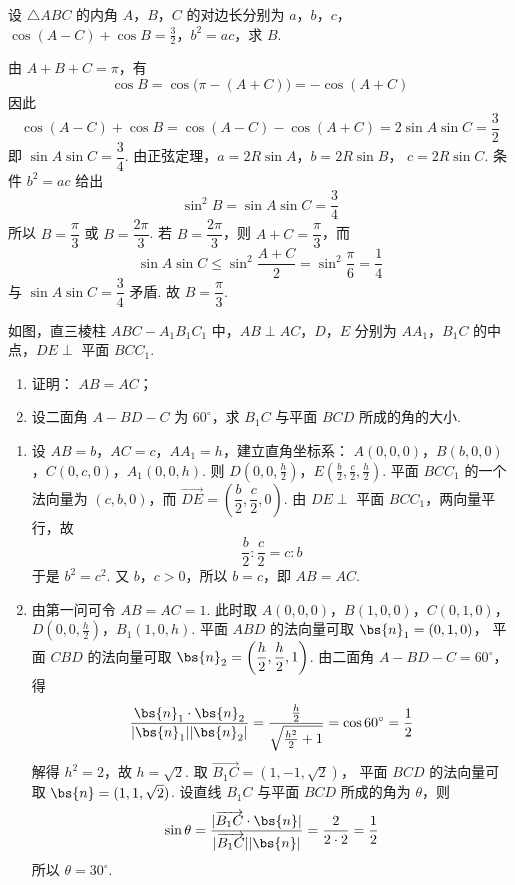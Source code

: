 \begin{problem}
设 \(\triangle ABC\) 的内角 \(A\)，\(B\)，\(C\) 的对边长分别为 \(a\)，\(b\)，\(c\)，\(\cos (A - C) + \cos B = \frac{3}{2}\)，\(b^2 = ac\)，求 \(B\).
\end{problem}

\begin{solution}
由 \(A+B+C=\pi\)，有
\[
\cos B=\cos\bigl(\pi-(A+C)\bigr)=-\cos(A+C)
\]
因此
\[
\cos(A-C)+\cos B
=\cos(A-C)-\cos(A+C)
=2\sin A\sin C=\frac32
\]
即 \(\sin A\sin C=\dfrac34\).
由正弦定理，\(a=2R\sin A\)，\(b=2R\sin B\)，
\(c=2R\sin C\). 条件 \(b^2=ac\) 给出
\[
\sin^2B=\sin A\sin C=\frac34
\]
所以 \(B=\dfrac{\pi}{3}\) 或 \(B=\dfrac{2\pi}{3}\).
若 \(B=\dfrac{2\pi}{3}\)，则 \(A+C=\dfrac{\pi}{3}\)，而
\[
\sin A\sin C\leqslant
\sin^2\frac{A+C}{2}=\sin^2\frac{\pi}{6}=\frac14
\]
与 \(\sin A\sin C=\dfrac34\) 矛盾. 故
\(B=\dfrac{\pi}{3}\).
\end{solution}

\begin{problem}
如图，直三棱柱 \(ABC - A_{1}B_{1}C_{1}\) 中，\(AB \perp AC\)，\(D\)，\(E\) 分别为 \(A A_{1}\)，\(B_{1}C\) 的中点，\(DE \perp\) 平面 \(BCC_{1}\).

\begin{enumerate}
\item 证明： \(AB = AC\)；
\item 设二面角 \(A - BD - C\) 为 \(60^{\circ}\)，求 \(B_{1}C\) 与平面 \(BCD\) 所成的角的大小.
\end{enumerate}

\end{problem}

\begin{solution}
\begin{enumerate}
\item 设 \(AB=b\)，\(AC=c\)，\(AA_1=h\)，建立直角坐标系：
\(A(0,0,0)\)，\(B(b,0,0)\)，\(C(0,c,0)\)，\(A_1(0,0,h)\).
则
\(D\left(0,0,\frac h2\right)\)，\(E\left(\frac b2,\frac c2,\frac h2\right)\).
平面 \(BCC_1\) 的一个法向量为 \((c,b,0)\)，而
\(\overrightarrow{DE}=\left(\dfrac b2,\dfrac c2,0\right)\).
由 \(DE\perp\) 平面 \(BCC_1\)，两向量平行，故
\[
\frac b2:\frac c2=c:b
\]
于是 \(b^2=c^2\). 又 \(b\)，\(c>0\)，所以 \(b=c\)，即
\(AB=AC\).
\item 由第一问可令 \(AB=AC=1\). 此时取
\(A(0,0,0)\)，\(B(1,0,0)\)，\(C(0,1,0)\)，\(D\left(0,0,\frac h2\right)\)，\(B_1(1,0,h)\).
平面 \(ABD\) 的法向量可取 \(\bs{n}_1=(0,1,0)\)，
平面 \(CBD\) 的法向量可取
\(\bs{n}_2=\left(\dfrac h2,\dfrac h2,1\right)\).
由二面角 \(A-BD-C=60^\circ\)，得
\[
\frac{\bs{n}_1\cdot\bs{n}_2}
{|\bs{n}_1||\bs{n}_2|}
=\frac{\frac{h}{2}}{\sqrt{\frac{h^2}{2}+1}}=\cos60^\circ=\frac12
\]
解得 \(h^2=2\)，故 \(h=\sqrt2\).
取 \(\overrightarrow{B_1C}=(1,-1,\sqrt2)\)，
平面 \(BCD\) 的法向量可取
\(\bs{n}=(1,1,\sqrt2)\). 设直线 \(B_1C\) 与平面
\(BCD\) 所成的角为 \(\theta\)，则
\[
\sin\theta
=\frac{|\overrightarrow{B_1C}\cdot\bs{n}|}
{|\overrightarrow{B_1C}||\bs{n}|}
=\frac2{2\cdot2}=\frac12
\]
所以 \(\theta=30^\circ\).
\end{enumerate}
\end{solution}

